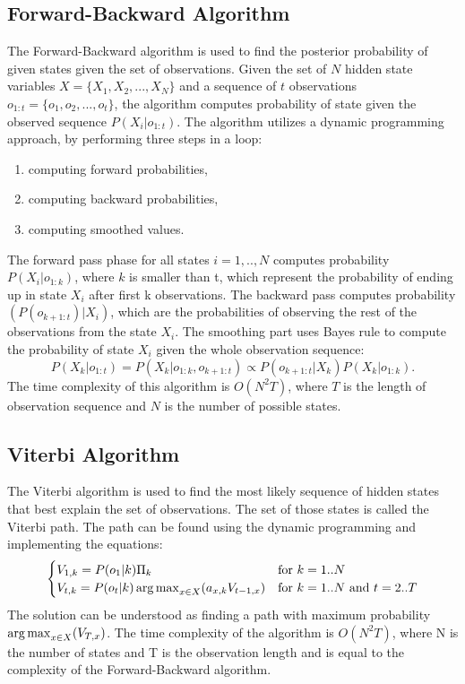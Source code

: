 \subsection{Forward-Backward Algorithm} 

The Forward-Backward algorithm is used to find the posterior probability of given states given the set of observations.
Given the set of $N$ hidden state variables $X = \{X_1, X_2, ..., X_N\}$ and a sequence of $t$ observations $o_{1:t} = \{o_1, o_2,...,o_t\}$, the algorithm computes probability of state given the observed sequence $P(X_i | o_{1:t})$.
The algorithm utilizes a dynamic programming approach, by performing three steps in a loop: 
\begin{enumerate}
\item computing forward probabilities,
\item computing backward probabilities,
\item computing smoothed values.
\end{enumerate}
The forward pass phase for all states $i=1,..,N$ computes probability $P(X_i | o_{1:k})$, where $k$ is smaller than t, which represent the probability of ending up in state $X_i$ after first k observations. 
The backward pass computes probability $(P(o_{k+1:t}) | X_i)$, which are the probabilities of observing the rest of the observations from the state $X_i$.
The smoothing part uses Bayes rule to compute the probability of state $X_i$ given the whole observation sequence:
\begin{equation}
P(X_k | o_{1:t}) = P(X_k | o_{1:k}, o_{k+1:t}) \propto P(o_{k+1:t} | X_k) P(X_k | o_{1:k}).
\end{equation}
The time complexity of this algorithm is $O(N^2 T)$, where $T$ is the length of observation sequence and $N$ is the number of possible states.


\subsection{Viterbi Algorithm}

The Viterbi algorithm is used to find the most likely sequence of hidden states that best explain the set of observations.
The set of those states is called the Viterbi path. 
The path can be found using the dynamic programming and implementing the equations:
\begin{equation}
\begin{cases} V_{1,k} = P(o_1 | k)  \Pi_k & \mbox{for } k = 1..N \\ V_{t,k} = P(o_t | k)  \operatorname*{arg\,max}_{x\in X} (a_{x,k}  V_{t-1,x}) & \mbox{for } k = 1..N\mbox{ and } t = 2..T \end{cases}
\end{equation}
The solution can be understood as finding a path with maximum probability $\operatorname*{arg\,max}_{x\in X} (V_{T,x})$. 
The time complexity of the algorithm is $O(N^2 T)$, where N is the number of states and T is the observation length and is equal to the complexity of the Forward-Backward algorithm.

